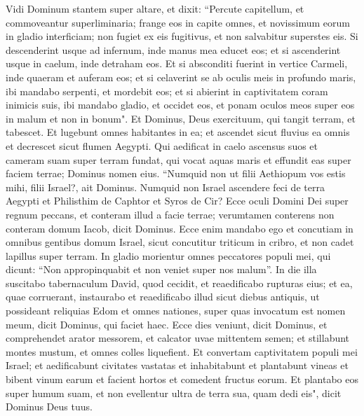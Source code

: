 \begin{biblechapter}  
\verse Vidi Dominum stantem super altare, et dixit: “Percute capitellum, et commoveantur superliminaria; frange eos in capite omnes, et novissimum eorum in gladio interficiam; non fugiet ex eis fugitivus, et non salvabitur superstes eis. 
\verse Si descenderint usque ad infernum, inde manus mea educet eos; et si ascenderint usque in caelum, inde detraham eos. 
\verse Et si absconditi fuerint in vertice Carmeli, inde quaeram et auferam eos; et si celaverint se ab oculis meis in profundo maris, ibi mandabo serpenti, et mordebit eos; 
\verse et si abierint in captivitatem coram inimicis suis, ibi mandabo gladio, et occidet eos, et ponam oculos meos super eos in malum et non in bonum". 
\verse Et Dominus, Deus exercituum, qui tangit terram, et tabescet. Et lugebunt omnes habitantes in ea; et ascendet sicut fluvius ea omnis et decrescet sicut flumen Aegypti. 
\verse Qui aedificat in caelo ascensus suos et cameram suam super terram fundat, qui vocat aquas maris et effundit eas super faciem terrae; Dominus nomen eius. 
\verse “Numquid non ut filii Aethiopum vos estis mihi, filii Israel?, ait Dominus. Numquid non Israel ascendere feci de terra Aegypti et Philisthim de Caphtor et Syros de Cir? 
\verse Ecce oculi Domini Dei super regnum peccans, et conteram illud a facie terrae; verumtamen conterens non conteram domum Iacob, dicit Dominus. 
\verse Ecce enim mandabo ego et concutiam in omnibus gentibus domum Israel, sicut concutitur triticum in cribro, et non cadet lapillus super terram. 
\verse In gladio morientur omnes peccatores populi mei, qui dicunt: “Non appropinquabit et non veniet super nos malum”. 
\verse In die illa suscitabo tabernaculum David, quod cecidit, et reaedificabo rupturas eius; et ea, quae corruerant, instaurabo et reaedificabo illud sicut diebus antiquis, 
\verse ut possideant reliquias Edom et omnes nationes, super quas invocatum est nomen meum, dicit Dominus, qui faciet haec. 
\verse Ecce dies veniunt, dicit Dominus, et comprehendet arator messorem, et calcator uvae mittentem semen; et stillabunt montes mustum, et omnes colles liquefient. 
\verse Et convertam captivitatem populi mei Israel; et aedificabunt civitates vastatas et inhabitabunt et plantabunt vineas et bibent vinum earum et facient hortos et comedent fructus eorum. 
\verse Et plantabo eos super humum suam, et non evellentur ultra de terra sua, quam dedi eis", dicit Dominus Deus tuus.    
\end{biblechapter}

